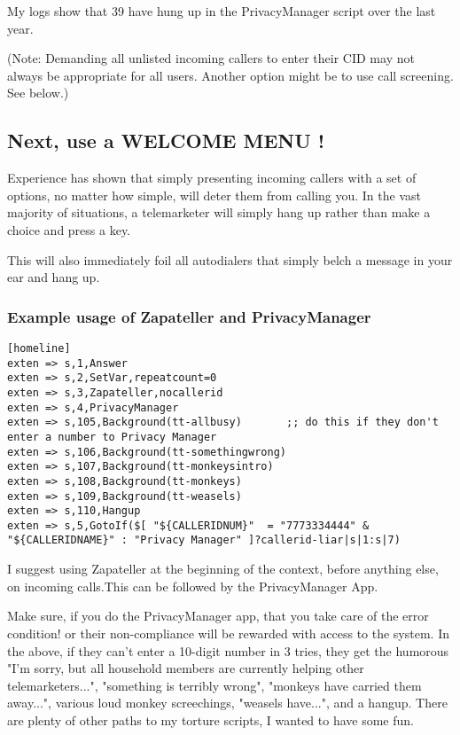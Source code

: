My logs show that 39 have hung up in the PrivacyManager script over
the last year.

(Note: Demanding all unlisted incoming callers to enter their CID may
not always be appropriate for all users. Another option might be to
use call screening. See below.)


\subsection{Next, use a WELCOME MENU !}

Experience has shown that simply presenting incoming callers with
a set of options, no matter how simple, will deter them from calling
you. In the vast majority of situations, a telemarketer will simply
hang up rather than make a choice and press a key.

This will also immediately foil all autodialers that simply belch a
message in your ear and hang up.

\subsubsection{Example usage of Zapateller and PrivacyManager}
\begin{verbatim}
[homeline]
exten => s,1,Answer
exten => s,2,SetVar,repeatcount=0
exten => s,3,Zapateller,nocallerid
exten => s,4,PrivacyManager
exten => s,105,Background(tt-allbusy)       ;; do this if they don't enter a number to Privacy Manager
exten => s,106,Background(tt-somethingwrong)
exten => s,107,Background(tt-monkeysintro)
exten => s,108,Background(tt-monkeys)
exten => s,109,Background(tt-weasels)
exten => s,110,Hangup
exten => s,5,GotoIf($[ "${CALLERIDNUM}"  = "7773334444" &  "${CALLERIDNAME}" : "Privacy Manager" ]?callerid-liar|s|1:s|7)
\end{verbatim}

I suggest using Zapateller at the beginning of the context, before
anything else, on incoming calls.This can be followed by the
PrivacyManager App.

Make sure, if you do the PrivacyManager app, that you take care of the
error condition! or their non-compliance will be rewarded with access
to the system. In the above, if they can't enter a 10-digit number in
3 tries, they get the humorous "I'm sorry, but all household members
are currently helping other telemarketers...", "something is terribly
wrong", "monkeys have carried them away...", various loud monkey
screechings, "weasels have...", and a hangup. There are plenty of
other paths to my torture scripts, I wanted to have some fun.


